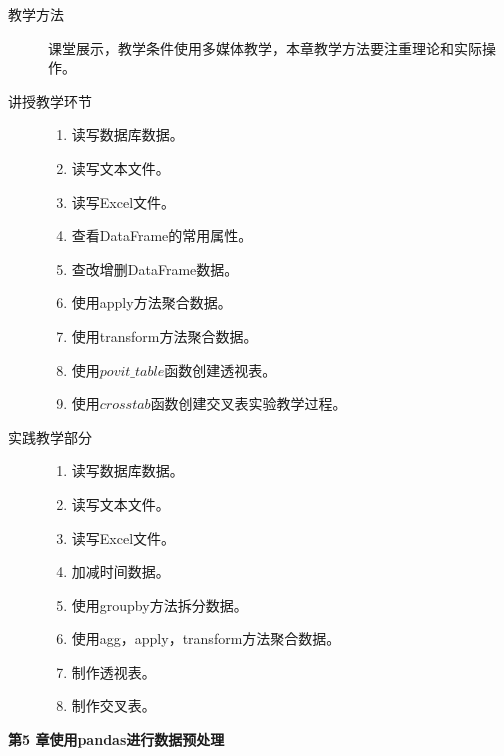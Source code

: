 \documentclass[12pt,a4paper,openany,cap]{ctexbook}
\begin{document}
\begin{description}
  \item[教学方法]课堂展示，教学条件使用多媒体教学，本章教学方法要注重理论和实际操作。
\item[讲授教学环节]
  \begin{minipage}[t]{0.8\linewidth}
    \begin{enumerate}
    \item    读写数据库数据。
\item\label{item:118}  读写文本文件。
\item\label{item:119}  读写Excel文件。
\item\label{item:120}  查看DataFrame的常用属性。
\item\label{item:121}  查改增删DataFrame数据。
\item\label{item:128}  使用apply方法聚合数据。
\item\label{item:129}  使用transform方法聚合数据。
\item\label{item:130}  使用$povit\_table$函数创建透视表。
\item\label{item:131}  使用$crosstab$函数创建交叉表实验教学过程。
  \end{enumerate}
  \end{minipage}

\item[实践教学部分]
  \begin{minipage}[t]{0.8\linewidth}
    \begin{enumerate}
    \item  读写数据库数据。
\item\label{item:132}  读写文本文件。
\item\label{item:133}  读写Excel文件。
\item\label{item:139}  加减时间数据。
\item\label{item:140}  使用groupby方法拆分数据。
\item\label{item:141}  使用agg，apply，transform方法聚合数据。
\item\label{item:142}  制作透视表。
\item\label{item:143}  制作交叉表。
    \end{enumerate}
  \end{minipage}

  
\end{description}

\begin{center}
   \textbf{第5 章\quad 使用pandas进行数据预处理 }
\end{center}
\end{document}
